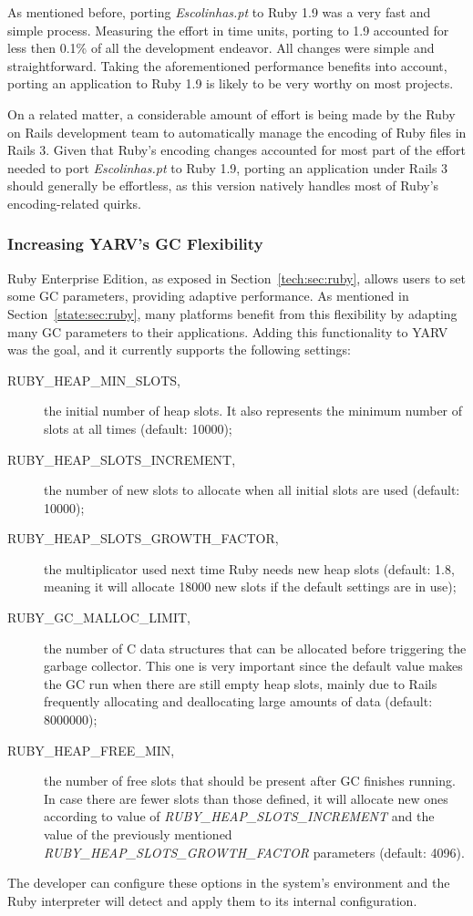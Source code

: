 As mentioned before, porting \textit{Escolinhas.pt} to Ruby 1.9 was a very fast and simple process. Measuring the effort in time units, porting to 1.9 accounted for less then 0.1\% of all the development endeavor. All changes were simple and straightforward. Taking the aforementioned performance benefits into account, porting an application to Ruby 1.9 is likely to be very worthy on most projects.

On a related matter, a considerable amount of effort is being made by the Ruby on Rails development team to automatically manage the encoding of Ruby files in Rails 3. Given that Ruby's encoding changes accounted for most part of the effort needed to port \textit{Escolinhas.pt} to Ruby 1.9, porting an application under Rails 3 should generally be effortless, as this version natively handles most of Ruby's encoding-related quirks.

\subsubsection{Increasing YARV's GC Flexibility}
Ruby Enterprise Edition, as exposed in Section~\ref{tech:sec:ruby}, allows users to set some GC parameters, providing adaptive performance. As mentioned in Section~\ref{state:sec:ruby}, many platforms benefit from this flexibility by adapting many GC parameters to their applications. Adding this functionality to YARV was the goal, and it currently supports the following settings:
\begin{description}
  \item[RUBY\_HEAP\_MIN\_SLOTS,] the initial number of heap slots. It also represents the minimum number of slots at all times (default: 10000);
  \item[RUBY\_HEAP\_SLOTS\_INCREMENT,] the number of new slots to allocate when all initial slots are used (default: 10000);
  \item[RUBY\_HEAP\_SLOTS\_GROWTH\_FACTOR,] the multiplicator used next time Ruby needs new heap slots (default: 1.8, meaning it will allocate 18000 new slots if the default settings are in use);
  \item[RUBY\_GC\_MALLOC\_LIMIT,] the number of C data structures that can be allocated before triggering the garbage collector. This one is very important since the default value makes the GC run when there are still empty heap slots, mainly due to Rails frequently allocating and deallocating large amounts of data (default: 8000000);
  \item[RUBY\_HEAP\_FREE\_MIN,] the number of free slots that should be present after GC finishes running. In case there are fewer slots than those defined, it will allocate new ones according to value of \textit{RUBY\_HEAP\_SLOTS\_INCREMENT} and the value of the previously mentioned \textit{RUBY\_HEAP\_SLOTS\_GROWTH\_FACTOR} parameters (default: 4096).
\end{description}
The developer can configure these options in the system's environment and the Ruby interpreter will detect and apply them to its internal configuration.

